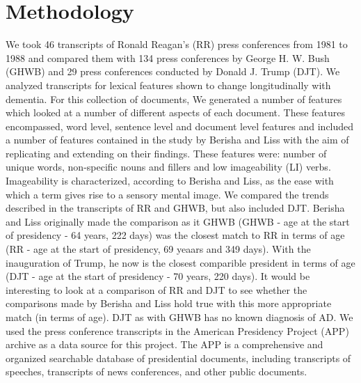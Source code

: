 \documentclass[10pt]{article}
\begin{document}
\section{Methodology}
We took 46 transcripts of Ronald Reagan’s (RR) press conferences from 1981 to 1988 and compared them with 134 press conferences by George H. W. Bush (GHWB) and 29 press conferences conducted by Donald J. Trump (DJT).  We analyzed transcripts for lexical features shown to change longitudinally with dementia. For this collection of documents, We generated a number of features which looked at a number of different aspects of each document. These features encompassed, word level, sentence level and document level features and included a number of features contained in the study by Berisha and Liss with the aim of replicating and extending on their findings. These features were: number of unique words, non-specific nouns and fillers and low imageability (LI) verbs. Imageability is characterized, according to Berisha and Liss, as the ease with which a term gives rise to a sensory mental image. We compared the trends described in the transcripts of RR and GHWB, but also included DJT. Berisha and Liss originally made the comparison as it GHWB (GHWB - age at the start of presidency - 64 years, 222 days) was the closest match to RR in terms of age (RR  - age at the start of presidency, 69 yeaars and 349 days). With the inauguration of Trump, he now is the closest comparible president in terms of age (DJT - age at the start of presidency - 70 years, 220 days). It would be interesting to look at a comparison of RR and DJT to see whether the comparisons made by Berisha and Liss hold true with this more appropriate match (in terms of age). DJT as with GHWB has no known diagnosis of AD. We used the press conference transcripts in the American Presidency Project (APP) archive as a data source for this project. The APP is a comprehensive and organized searchable database of presidential documents, including transcripts of speeches, transcripts of news conferences, and other public documents.
\end{document}
